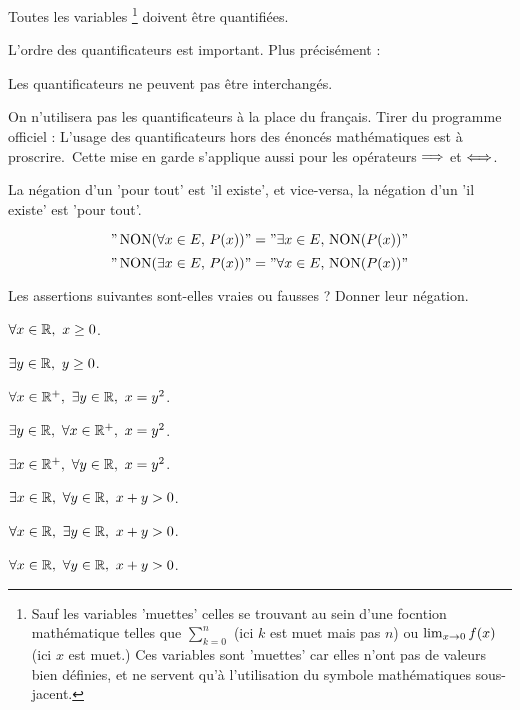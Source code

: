 \documentclass[a4paper, 11pt]{article}
\DeclareMathOperator{\NON}{NON}
\begin{document}
\warning[5ex] Toutes les variables \footnote{Sauf les variables 'muettes' celles se trouvant au sein d'une focntion mathématique telles que $\sum_{k=0}^n$  (ici $k$ est muet mais pas $n$) ou $\lim_{x\rightarrow 0} f(x)$ (ici $x$ est muet.) Ces variables sont 'muettes' car elles n'ont pas de valeurs bien définies, et ne servent qu'à l'utilisation du symbole mathématiques sous-jacent.  } doivent être quantifiées. 


\warning[5ex]L'ordre des quantificateurs est important. Plus précisément : 

\warning[5ex] Les quantificateurs ne peuvent pas être interchangés.

\warning[5ex] On n'utilisera pas les quantificateurs à la place du français. 
Tirer du programme officiel : \og L'usage des quantificateurs hors des énoncés mathématiques est à proscrire.\fg \
 Cette mise en garde s'applique aussi pour les opérateurs $\Longrightarrow$ et $\Longleftrightarrow$. \\

\bigskip

La négation d'un 'pour tout' est 'il existe', et vice-versa, la négation d'un 'il existe' est 'pour tout'. 

$$"\NON( \forall x\in E, \, P(x)) " = "\exists x\in E, \, \NON(P(x))"$$
$$"\NON( \exists x\in E, \, P(x))" = "\forall x\in E, \, \NON(P(x))"$$



\begin{exercice}  \;
Les assertions suivantes sont-elles vraies ou fausses ? Donner leur n\'egation.
\begin{enumerate}
\begin{minipage}[t]{0.45\textwidth}
 \item
$\forall x\in\mathbb{R},\ x\geq 0$. 
\item 
$\exists y\in\mathbb{R},\ y\geq 0$.
\item 
$\forall x\in\R^{+},\ \exists y\in\R,\ x=y^2$.
\item 
$\exists y\in\R,\ \forall x\in\R^{+},\ x=y^2$.
\end{minipage}
\begin{minipage}[t]{0.45\textwidth}
\item 
$\exists x\in\R^{+},\ \forall y\in\R,\ x=y^2$.
\item 
$\exists x\in\R,\ \forall y\in\R,\ x+y>0$.
\item 
$\forall x\in\R,\ \exists y\in\R,\ x+y>0$.
\item 
$\forall x\in\R,\ \forall y\in\R,\ x+y>0$.
\end{minipage}
\end{enumerate}
\end{exercice}
\end{document}

